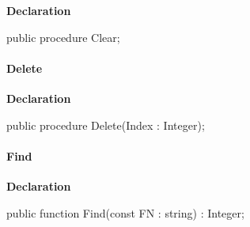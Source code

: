 \documentclass{report}
\newif\ifpdf
\begin{document}
\label{AbArcTyp.TAbArchiveList-Clear}
\begin{list}{}{
\setlength{\itemindent}{0cm}
\setlength{\listparindent}{0cm}
\setlength{\leftmargin}{\evensidemargin}
\addtolength{\leftmargin}{\tmplength}
\settowidth{\labelsep}{X}
\addtolength{\leftmargin}{\labelsep}
\setlength{\labelwidth}{\tmplength}
}
\item[\textbf{Declaration}\hfill]
\ifpdf
\begin{flushleft}
\fi
\begin{ttfamily}
public procedure Clear;\end{ttfamily}

\ifpdf
\end{flushleft}
\fi

\end{list}
\paragraph*{Delete}\hspace*{\fill}

\label{AbArcTyp.TAbArchiveList-Delete}
\begin{list}{}{
\setlength{\itemindent}{0cm}
\setlength{\listparindent}{0cm}
\setlength{\leftmargin}{\evensidemargin}
\addtolength{\leftmargin}{\tmplength}
\settowidth{\labelsep}{X}
\addtolength{\leftmargin}{\labelsep}
\setlength{\labelwidth}{\tmplength}
}
\item[\textbf{Declaration}\hfill]
\ifpdf
\begin{flushleft}
\fi
\begin{ttfamily}
public procedure Delete(Index : Integer);\end{ttfamily}

\ifpdf
\end{flushleft}
\fi

\end{list}
\paragraph*{Find}\hspace*{\fill}

\label{AbArcTyp.TAbArchiveList-Find}
\begin{list}{}{
\setlength{\itemindent}{0cm}
\setlength{\listparindent}{0cm}
\setlength{\leftmargin}{\evensidemargin}
\addtolength{\leftmargin}{\tmplength}
\settowidth{\labelsep}{X}
\addtolength{\leftmargin}{\labelsep}
\setlength{\labelwidth}{\tmplength}
}
\item[\textbf{Declaration}\hfill]
\ifpdf
\begin{flushleft}
\fi
\begin{ttfamily}
public function Find(const FN : string) : Integer;\end{ttfamily}

\ifpdf
\end{flushleft}
\fi

\end{list}
\end{document}

